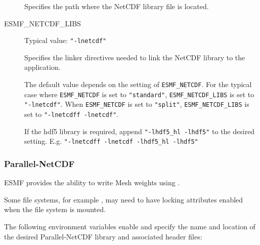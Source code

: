 \begin{description}
Specifies the path where the NetCDF library file is located.

\item[ESMF\_NETCDF\_LIBS] Typical value: {\tt "-lnetcdf"}

Specifies the linker directives needed to link the NetCDF library to
the application.

The default value depends on the setting of {\tt ESMF\_NETCDF}.  For the
typical case where {\tt ESMF\_NETCDF} is set to {\tt "standard"},
{\tt ESMF\_NETCDF\_LIBS} is set to {\tt "-lnetcdf"}.
When {\tt ESMF\_NETCDF} is set to {\tt "split"}, {\tt ESMF\_NETCDF\_LIBS}
is set to {\tt "-lnetcdff -lnetcdf"}.

If the hdf5 library is required, append {\tt "-lhdf5\_hl -lhdf5"} to the
desired setting.  E.g. {\tt "-lnetcdff -lnetcdf -lhdf5\_hl -lhdf5"}
\end{description}

\subsubsection{Parallel-NetCDF}
\label{sec:pnetcdf}
ESMF provides the ability to write Mesh weights using
.

Some file systems, for example , may need
to have locking attributes enabled when the file system is mounted.

The following environment variables enable and specify the name and
location of the desired Parallel-NetCDF library and associated header files:

